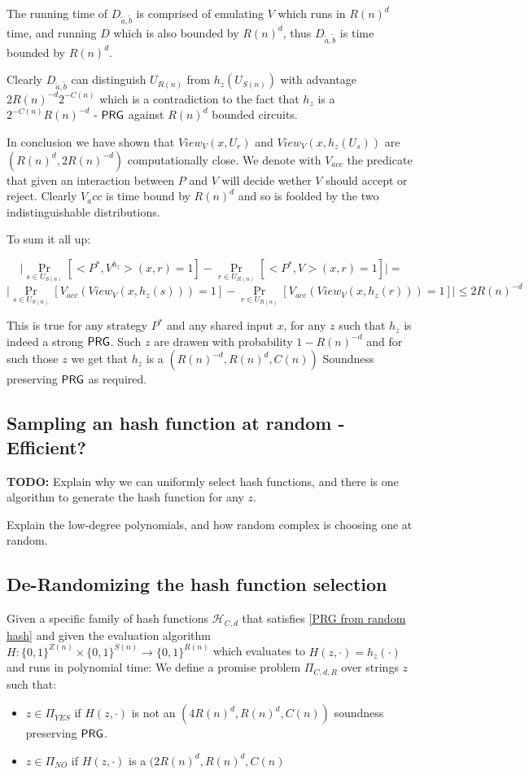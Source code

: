 \documentclass[11]{article}
\newenvironment{proof}[1][Proof]{\begin{trivlist}
\item[\hskip \labelsep {\bfseries #1}]}{\end{trivlist}}
\begin{document}
\begin{proof}
The running time of $D_{\tilde{a}, \tilde{b}}$ is comprised of emulating $V$ which runs in $R(n)^d$ time, and running $D$ which is also bounded by $R(n)^d$, thus $D_{\tilde{a}, \tilde{b}}$ is time bounded by $R(n)^d$.

Clearly $D_{\tilde{a}, \tilde{b}}$ can distinguish $U_{R(n)}$ from $h_z(U_{S(n)})$ with advantage $2R(n)^{-d} 2^{-C(n)}$ which is a contradiction to the fact that $h_z$ is a $2^{-C(n)} R(n)^{-d}$ - $\mathsf{PRG}$ against $R(n)^d$ bounded circuits.

In conclusion we have shown that $View_V(x,U_r)$ and $View_V(x, h_z(U_s))$ are $(R(n)^d, 2R(n)^{-d})$ computationally close. We denote with $V_{acc}$ the predicate that given an interaction between $P$ and $V$ will decide wether $V$ should accept or reject. Clearly $V_acc$ is time bound by $R(n)^d$ and so is foolded by the two indistinguishable distributions.

To sum it all up:

$$ \bigg| \Pr_{s \in U_{S(n)}} [<P^*, V^{h_z}>(x, r) = 1] - \Pr_{r \in U_{R(n)}}[<P^*, V>(x,r) = 1] \bigg| = $$
$$ \bigg| \Pr_{s \in U_{S(n)}} [V_{acc}(View_V(x, h_z(s))) = 1] - \Pr_{r \in U_{R(n)}} [V_{acc}(View_V(x, h_z(r))) = 1] \bigg| \leq 2R(n)^{-d}$$

This is true for any strategy $P^*$ and any shared input $x$, for any $z$ such that $h_z$ is indeed a strong $\mathsf{PRG}$. Such $z$ are drawen with probability $1 - R(n)^{-d}$ and for such those $z$ we get that $h_z$ is a $(R(n)^{-d}, R(n)^d, C(n))$ Soundness preserving $\mathsf{PRG}$ as required.

\end{proof}

\subsection{Sampling an hash function at random - Efficient?}

\textbf{TODO:}
Explain why we can uniformly select hash functions, and there is one algorithm to generate the hash function for any $z$.

Explain the low-degree polynomials, and how random complex is choosing one at random.

\subsection{De-Randomizing the hash function selection}
Given a specific family of hash functions $\mathcal{H}_{C,d}$ that satisfies \ref{PRG from random hash} and given the evaluation algorithm $H: \{0,1\}^{Z(n)} \times \{0,1\}^{S(n)} \to \{0,1\}^{R(n)}$ which evaluates to $H(z, \cdot) = h_z(\cdot)$ and runs in polynomial time:
We define a promise problem $\Pi_{C,d,R}$ over strings $z$ such that:
\begin{itemize}
	\item $z \in \Pi_{YES}$ if $H(z, \cdot)$ is not an $(4R(n)^d, R(n)^d, C(n))$ soundness preserving $\mathsf{PRG}$.
	\item $z \in \Pi_{NO}$ if $H(z, \cdot)$ is a $(2R(n)^d, R(n)^d, C(n)$
\end{itemize}
\end{document}
